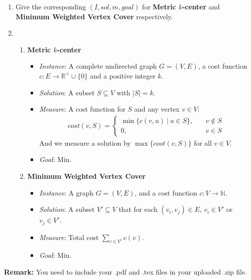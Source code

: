 \documentclass[12pt,a4paper]{article}
\makeatletter
\newtheorem*{solution}{Solution}
\theoremstyle{definition}
\renewenvironment{solution}[1][Solution] {\par\pushQED{\qed}\normalfont\topsep6\p@\@plus6\p@\relax\trivlist\item[\hskip\labelsep\bfseries#1\@addpunct{.}]\ignorespaces}{\popQED\endtrivlist\@endpefalse} \makeatother
\makeatother
\begin{document}
\begin{enumerate}
    \item
    Give the corresponding $(I,sol,m,goal)$ for \textbf{Metric $k$-center} and \textbf{Minimum Weighted Vertex Cover} respectively.
    \begin{solution}
        \begin{enumerate}
            \item \textbf{Metric $k$-center}
            \begin{itemize}
                \item \emph{Instance}: A complete undirected graph $G=(V,E)$, a cost function $c:E\rightarrow\mathbb{R}^+\cup\{0\}$ and a positive integer $k$.
                \item \emph{Solution}: A subset $S\subseteq V$ with $|S|=k$.
                \item \emph{Measure}: A cost function for $S$ and any vertex $v\in V$: \begin{align*}
                    cost(v,S)=\left\{\begin{matrix}
                        \min\{c(v,u)\ | \ u\in S\},\quad &v\notin S\\
                        0, &v\in S
                    \end{matrix}\right.
                \end{align*}
                And we measure a solution by $\max\{cost(v,S)\}$ for all $v\in V$.
                \item \emph{Goal}: Min.
            \end{itemize}

            \item \textbf{Minimum Weighted Vertex Cover}
            \begin{itemize}
                \item \emph{Instance}: A graph $G=(V,E)$, and a cost function $c:V\rightarrow\mathbb{N}$.
                \item \emph{Solution}: A subset $V'\subseteq V$ that for each $(v_i,v_j)\in E$, $v_i\in V'$ or $v_j\in V'$.
                \item \emph{Measure}: Total cost $\sum\limits_{v\in V'}c(v)$.
                \item \emph{Goal}: Min.
            \end{itemize}
        \end{enumerate}
    \end{solution}

\end{enumerate}

\vspace{20pt}

\textbf{Remark:} You need to include your .pdf and .tex files in your uploaded .zip file.

\end{document}
